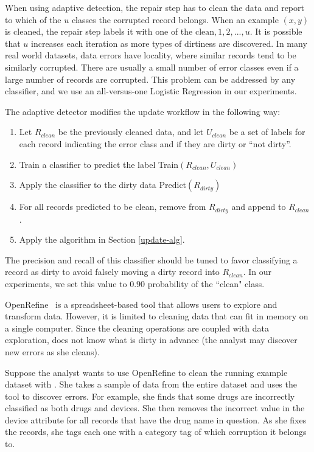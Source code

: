 When using adaptive detection, the repair step has to clean the data and report to which of the $u$ classes the corrupted record belongs.
When an example $(x,y)$ is cleaned, the repair step labels it with one of the ${\text{clean}, 1,2,...,u}$.
It is possible that $u$ increases each iteration as more types of dirtiness are discovered.
In many real world datasets, data errors have locality, where similar records tend to be similarly corrupted.
There are usually a small number of error classes even if a large number of records are corrupted.
This problem can be addressed by any classifier, and we use an all-versus-one Logistic Regression in our experiments.

The adaptive detector modifies the update workflow in the following way:
\begin{enumerate}
\item Let $R_{clean}$ be the previously cleaned data, and let $U_{clean}$ be a set of labels for each record indicating the error class and if they are dirty or ``not dirty''.
\item Train a classifier to predict the label \textsf{Train}$(R_{clean}, U_{clean})$
\item Apply the classifier to the dirty data \textsf{Predict}$(R_{dirty})$
\item For all records predicted to be clean, remove from $R_{dirty}$ and append to $R_{clean}$.
\item Apply the algorithm in Section \ref{update-alg}.
\end{enumerate}

The precision and recall of this classifier should be tuned to favor classifying a record as dirty to avoid falsely moving a dirty record into $R_{clean}$. In our experiments, we set this value to $0.90$ probability of the ``clean" class.

\vspace{0.75em}

\begin{example}\label{detex2}
OpenRefine~\cite{or} is a spreadsheet-based tool that allows users to explore and transform data.
However, it is limited to cleaning data that can fit in memory on a single computer.
Since the cleaning operations are coupled with data exploration, \sys does not know what is dirty in advance (the analyst may discover new errors as she cleans).

Suppose the analyst wants to use OpenRefine to clean the running example dataset with \sys.
She takes a sample of data from the entire dataset and uses the tool to discover errors.
For example, she finds that some drugs are incorrectly classified as both drugs and devices.
She then removes the incorrect value in the device attribute for all records that have the drug name in question.
As she fixes the records, she tags each one with a category tag of which corruption it belongs to.
\end{example}





